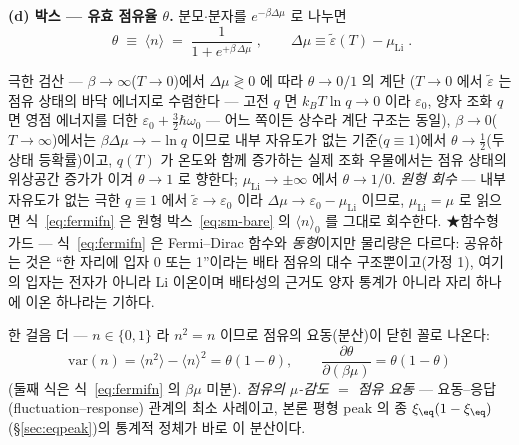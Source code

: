 \textbf{(d) 박스 --- 유효 점유율 $\theta$.} 분모$\cdot$분자를 $e^{-\beta\Delta\mu}$ 로 나누면
\begin{equation}
\boxed{\;\theta\;\equiv\;\langle n\rangle\;=\;\frac{1}{1+e^{+\beta\,\Delta\mu}}\;,
\qquad \Delta\mu\equiv\tilde\varepsilon(T)-\mu_\mathrm{Li}\;.}
\label{eq:fermifn}
\end{equation}
\begin{verifybox}
극한 검산 --- $\beta\to\infty$($T\to0$)에서 $\Delta\mu\gtrless0$ 에 따라 $\theta\to0/1$ 의 계단
($T\to0$ 에서 $\tilde\varepsilon$ 는 점유 상태의 바닥 에너지로 수렴한다 --- 고전 $q$ 면 $k_BT\ln q\to0$
이라 $\varepsilon_0$, 양자 조화 $q$ 면 영점 에너지를 더한 $\varepsilon_0+\tfrac32\hbar\omega_0$ --- 어느
쪽이든 상수라 계단 구조는 동일),
$\beta\to0$($T\to\infty$)에서는 $\beta\Delta\mu\to-\ln q$ 이므로 내부 자유도가 없는 기준($q\equiv1$)에서
$\theta\to\tfrac12$(두 상태 등확률)이고, $q(T)$ 가 온도와 함께 증가하는 실제 조화 우물에서는 점유 상태의
위상공간 증가가 이겨 $\theta\to1$ 로 향한다; $\mu_\mathrm{Li}\to\pm\infty$ 에서 $\theta\to1/0$.
\emph{원형 회수} --- 내부 자유도가 없는 극한 $q\equiv1$ 에서 $\tilde\varepsilon\to\varepsilon_0$ 이라
$\Delta\mu\to\varepsilon_0-\mu_\mathrm{Li}$ 이므로, $\mu_\mathrm{Li}=\mu$ 로 읽으면 식~\eqref{eq:fermifn}
은 원형 박스~\eqref{eq:sm-bare} 의 $\langle n\rangle_0$ 를 그대로 회수한다. ★함수형 가드 ---
식~\eqref{eq:fermifn} 은 Fermi--Dirac 함수와 \emph{동형}이지만
물리량은 다르다: 공유하는 것은 ``한 자리에 입자 0 또는 1''이라는 배타 점유의 대수 구조뿐이고(가정 1),
여기의 입자는 전자가 아니라 Li 이온이며 배타성의 근거도 양자 통계가 아니라 자리 하나에 이온 하나라는
기하다.
\end{verifybox}

한 걸음 더 --- $n\in\{0,1\}$ 라 $n^2=n$ 이므로 점유의 요동(분산)이 닫힌 꼴로 나온다:
\begin{equation}
\mathrm{var}(n)=\langle n^2\rangle-\langle n\rangle^2=\theta(1-\theta),
\qquad
\frac{\partial\theta}{\partial(\beta\mu)}=\theta(1-\theta)
\label{eq:sm-flucres}
\end{equation}
(둘째 식은 식~\eqref{eq:fermifn} 의 $\beta\mu$ 미분). \emph{점유의 $\mu$-감도 $=$ 점유 요동} --- 요동--응답
(fluctuation--response) 관계의 최소 사례이고, 본론 평형 peak 의 종 $\xi_\eq(1-\xi_\eq)$(\S\ref{sec:eqpeak})의
통계적 정체가 바로 이 분산이다.

